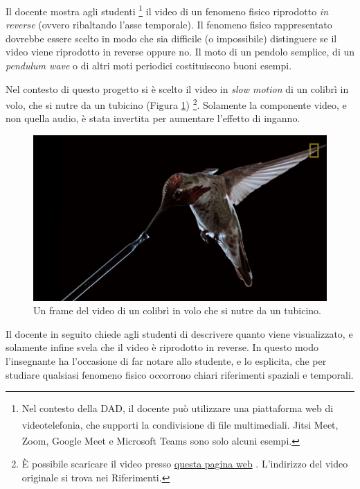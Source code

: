 \documentclass{report} \usepackage[T1]{fontenc} \usepackage[italian]{babel}
\begin{document}
Il docente mostra agli studenti
\footnote{
Nel contesto della DAD, il docente può utilizzare
una piattaforma web di videotelefonia, che supporti la condivisione
di file multimediali. Jitsi Meet\textsuperscript{\textregistered},
Zoom\textsuperscript{\textregistered},
Google Meet\textsuperscript{\textregistered} e
Microsoft Teams\textsuperscript{\textregistered}
sono solo alcuni esempi.
}
il video di un fenomeno fisico riprodotto \emph{in reverse} (ovvero ribaltando
l'asse temporale). Il fenomeno fisico rappresentato dovrebbe essere scelto
in modo che sia difficile (o impossibile) distinguere se il video viene
riprodotto in reverse oppure no. Il moto di un pendolo semplice,
di un \emph{pendulum wave} o di altri moti periodici costituiscono buoni
esempi.

Nel contesto di questo progetto si è scelto il video in \emph{slow motion}
di un colibrì in volo, che si nutre da un tubicino (Figura \ref{fig:hummingbird})
\footnote{
\`E possibile scaricare il video presso
\textcolor{blue}{\href{https://github.com/savaroskij/PED1/blob/master/progetto_finale/media/video/Hummingbird.mp4?raw=true}{questa pagina web}}
. L'indirizzo del video originale si trova nei Riferimenti\cite{hbird}.
}.
Solamente la componente video, e non quella audio, è stata invertita per
aumentare l'effetto di inganno.
\begin{figure}
\centering
  \includegraphics[width=\textwidth]{Hummingbird}
  \caption{Un frame del video di un colibrì in volo che si nutre da un tubicino.}
  \label{fig:hummingbird}
\end{figure}
Il docente in seguito chiede agli studenti di descrivere quanto viene
visualizzato, e solamente infine svela che il video è riprodotto in
reverse. In questo modo l'insegnante ha l'occasione di far notare
allo studente, e lo esplicita, che per studiare qualsiasi fenomeno fisico
occorrono chiari riferimenti spaziali e temporali.
\end{document}
